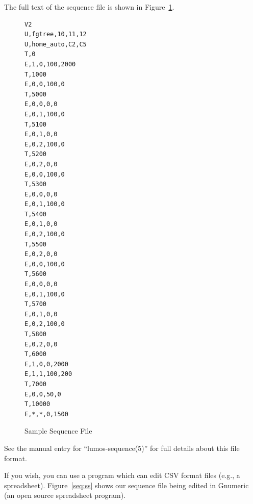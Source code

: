 \documentclass{article}
\begin{document}
The full text of the sequence file is shown in Figure~\ref{seq:all}.

\begin{figure}[p]
\begin{verbatim}
V2
U,fgtree,10,11,12
U,home_auto,C2,C5
T,0
E,1,0,100,2000
T,1000
E,0,0,100,0
T,5000
E,0,0,0,0
E,0,1,100,0
T,5100
E,0,1,0,0
E,0,2,100,0
T,5200
E,0,2,0,0
E,0,0,100,0
T,5300
E,0,0,0,0
E,0,1,100,0
T,5400
E,0,1,0,0
E,0,2,100,0
T,5500
E,0,2,0,0
E,0,0,100,0
T,5600
E,0,0,0,0
E,0,1,100,0
T,5700
E,0,1,0,0
E,0,2,100,0
T,5800
E,0,2,0,0
T,6000
E,1,0,0,2000
E,1,1,100,200
T,7000
E,0,0,50,0
T,10000
E,*,*,0,1500
\end{verbatim}
\caption{Sample Sequence File}
\label{seq:all}
\end{figure}

See the manual entry for ``lumos-sequence(5)'' for full details about this
file format.

If you wish, you can use a program which can edit CSV format files (e.g., a
spreadsheet).  Figure~\ref{seq:ss} shows our sequence file being edited in
Gnumeric (an open source spreadsheet program).
\end{document}
